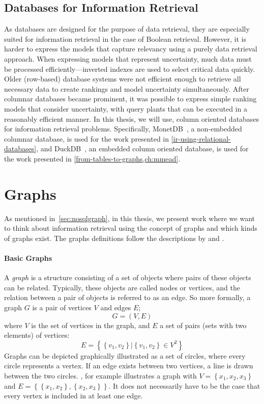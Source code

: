 \subsection{Databases for Information Retrieval}
As databases are designed for the purpose of data retrieval, they are especially suited for information retrieval in the case of Boolean retrieval. However, it is harder to express the models that capture relevancy using a purely data retrieval approach.
When expressing models that represent uncertainty, much data must be processed efficiently—inverted indexes are used to select critical data quickly. Older (row-based) database systems were not efficient enough to retrieve all necessary data to create rankings and model uncertainty simultaneously. After columnar databases became prominent, it was possible to express simple ranking models that consider uncertainty, with query plants that can be executed in a reasonably efficient manner. In this thesis, we will use, column oriented databases for information retrieval problems. Specifically, MonetDB~\citep{monet}, a non-embedded columnar database, is used for the work presented in \cref{ir-using-relational-databases}, and DuckDB~\citep{duckdb}, an embedded column oriented database, is used for the work presented in \cref{from-tables-to-graphs,ch:mmead}.

\section{Graphs}
\label{sec:graphs}
As mentioned in~\cref{sec:nosqlgraph}, in this thesis, we present work where we want to think about information retrieval using the concept of graphs and
which kinds of graphs exist. The graphs definitions follow the descriptions by \citet{big-graphs} and \citet{angles2018property}.

\paragraph{Basic Graphs}
A \emph{graph} is a structure consisting of a set of objects where pairs of these objects can be related. Typically, these objects are called nodes or vertices, and the relation between a pair of objects is referred to as an edge. So more formally, a graph $G$ is a pair of vertices $V$ and edges $E$;
\begin{equation}
	G = (V, E)
\end{equation}
where $V$ is the set of vertices in the graph, and $E$ a set of pairs (sets with two elements) of vertices:
\begin{equation}
	E = \left\{\left\{v_1, v_2\right\} | \left\{v_1, v_2\right\} \in V^2\right\}
	\label{undirected-edges}
\end{equation}
Graphs  can be depicted graphically illustrated as a set of circles, where every circle represents a vertex. If an edge exists between two vertices, a line is drawn between the two circles. , for example illustrates a graph with $V = \left\{x_1, x_2, x_3\right\}$ and $E = \left\{\left\{x_1, x_2\right\}, \left\{x_2, x_3\right\}\right\}$. It does not necessarily have to be the case that every vertex is included in at least one edge.

